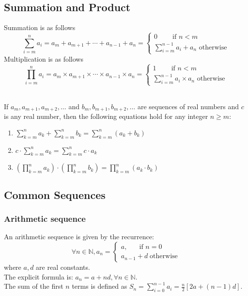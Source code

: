 \documentclass[12pt]{article}
\begin{document}
\subsection{Summation and Product}
Summation is as follows
\[
\sum^{n}_{i=m} a_i =
                     a_m + a_{m+1} + \cdots + a_{n-1} + a_n
                    =\begin{cases}
                      0 \;\;\;\;\;\;\;\;\text{if }n<m\\
                      \sum^{n-1}_{i=m} a_i +a_n\text{  otherwise}
                      \end{cases}
\]
Multiplication is as follows
\[
\prod^{n}_{i=m} a_i =
                     a_m \times a_{m+1} \times \cdots \times a_{n-1} \times a_n
                    =\begin{cases}
                      1 \;\;\;\;\;\;\;\;\text{if }n<m\\
                      \sum^{n-1}_{i=m} a_i \times a_n\text{  otherwise}
                      \end{cases}
\]
\begin{theorem}[5.1.1(Epp)]
\hfill\\
\normalfont If $a_m, a_{m+1},a_{m+2},\ldots$ and $b_m, b_{m+1},b_{m+2},\ldots$ are sequences of real numbers and $c$ is any real number, then the following equations hold for any integer $n\geq m$:
\begin{enumerate}
\item $\sum^{n}_{k=m} a_k +\sum^{n}_{k=m} b_k = \sum^{n}_{k=m} (a_k+b_k)$
\item $c\cdot \sum^{n}_{k=m} a_k = \sum^{n}_{k=m} c\cdot a_k$
\item $\left(\prod^{n}_{k=m} a_k \right)\cdot \left(\prod^{n}_{k=m} b_k \right) = \prod^{n}_{k=m} (a_k\cdot b_k)$
\end{enumerate} 
\end{theorem}
\subsection{Common Sequences}
\subsubsection{Arithmetic sequence}
An arithmetic sequence is given by the recurrence:
\[
\forall n\in\mathbb{N}, a_n=\begin{cases}
        a,\;\;\;\;\;\text{ if }n=0\\
        a_{n-1}+d\;\text{otherwise}
        \end{cases}
\]
where $a,d$ are real constants.\\
The explicit formula is: $a_n = a +nd, \forall n\in\mathbb{N}$.\\
The sum of the first $n$ terms is defined as $S_n=\sum^{n-1}_{i=0}a_i=\frac{n}{2}[2a+(n-1)d]$.
\end{document}
